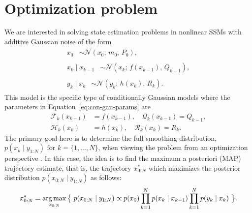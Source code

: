 \documentclass[dissertation,math,vertlayout,pdfa,colorlinks,nologo]{aaltoseries}
\DeclareMathOperator*{\argmax}{arg\,max}
\begin{document}
\section{Optimization problem}
 We are interested in solving state estimation problems in nonlinear SSMs with additive Gaussian noise of the form
\begin{subequations} \label{eq:nonlinear-additive-gaussian-ssm}
    \begin{align}
        \begin{split} \label{eq:cond-gaussian-x0}
            x_0 &\sim \mathcal{N}(x_0;\,  m_0, \, P_0),
        \end{split}\\
        \begin{split} \label{eq:cond-gaussian-dynamic}
            x_k \mid x_{k - 1} &\sim \mathcal{N}(x_k;\, f(x_{k-1}),\,  Q_{k-1}), 
        \end{split}\\
        \begin{split} \label{eq:cond-gaussian-measurement}
            y_k \mid x_k &\sim \mathcal{N}(y_k;\,  h(x_k), \, R_k).
        \end{split}
    \end{align}
\end{subequations}
This model is the specific type of conditionally Gaussian models where the parameters in Equation~\eqref{eq:con-gau-params} are
\begin{equation} \label{eq:nag-params}
    \begin{split}
        \mathcal{F}_k(x_{k-1}) &= f(x_{k-1}), \quad \mathcal{Q}_k(x_{k-1}) = Q_{k-1}, \\
        \mathcal{H}_k(x_{k}) &= h(x_k), \quad \mathcal{R}_k(x_{k}) = R_k.
    \end{split}
\end{equation}
The primary goal here is to determine the full smoothing distribution, $p(x_k \mid y_{1:N})$ for $k = \{1, \ldots, N\}$, when viewing the problem from an optimization perspective \citep{bell1994iterated, sarkka2020levenberg}. In this case, the idea is to find the maximum a posteriori (MAP) trajectory estimate, that is, the trajectory $x^*_{0:N}$ which maximizes the posterior distribution $p(x_{0:N} \mid y_{1:N})$ as follows:
\begin{equation} \label{eq:map-1}
    \begin{split}
        x^*_{0:N} = \argmax_{x_{0:N}}\big{\{}\, \, p(x_{0:N} \mid y_{1:N}) \propto p(x_0) \prod_{k=1}^{N} p(x_{k} \mid x_{k-1})  \prod_{k=1}^{N} p(y_{k} \mid x_k) \, \, \big{\}}.
    \end{split}
\end{equation}
\end{document}
